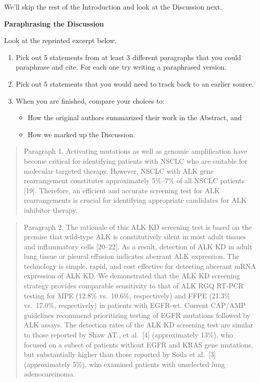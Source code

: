 \documentclass[
]{book}
\providecommand{\tightlist}{%
  \setlength{\itemsep}{0pt}\setlength{\parskip}{0pt}}
\begin{document}
We'll skip the rest of the Introduction and look at the Discussion next.

\textbf{Paraphrasing the Discussion}

Look at the reprinted excerpt below.

\begin{enumerate}
\def\labelenumi{\arabic{enumi}.}
\tightlist
\item
  Pick out 5 statements from at least 3 different paragraphs that you could paraphrase and cite. For each one try writing a paraphrased version.
\item
  Pick out 5 statements that you would need to track back to an earlier source.
\item
  When you are finished, compare your choices to:

  \begin{itemize}
  \tightlist
  \item
    How the original authors summarized their work in the Abstract, and
  \item
    How we marked up the Discussion.
  \end{itemize}
\end{enumerate}

\begin{quote}
Paragraph 1. Activating mutations as well as genomic amplification have become critical for identifying patients with NSCLC who are suitable for molecular targeted therapy. However, NSCLC with ALK gene rearrangement constitutes approximately 5\%--7\% of all NSCLC patients {[}19{]}. Therefore, an efficient and accurate screening test for ALK rearrangements is crucial for identifying appropriate candidates for ALK inhibitor therapy.
\end{quote}

\begin{quote}
Paragraph 2. The rationale of this ALK KD screening test is based on the premise that wild-type ALK is constitutively silent in most adult tissues and inflammatory cells {[}20--22{]}. As a result, detection of ALK KD in adult lung tissue or pleural effusion indicates aberrant ALK expression. The technology is simple, rapid, and cost effective for detecting aberrant mRNA expression of ALK KD. We demonstrated that the ALK KD screening strategy provides comparable sensitivity to that of ALK RGQ RT-PCR testing for MPE (12.8\% vs.~10.6\%, respectively) and FFPE (21.3\% vs.~17.0\%, respectively) in patients with EGFR-wt. Current CAP/AMP guidelines recommend prioritizing testing of EGFR mutations followed by ALK assays. The detection rates of the ALK KD screening test are similar to those reported by Shaw AT., et al.~{[}4{]} (approximately 13\%), who focused on a subset of patients without EGFR and KRAS gene mutations, but substantially higher than those reported by Soda et al.~{[}3{]} (approximately 5\%), who examined patients with unselected lung adenocarcinoma.
\end{quote}
\end{document}
